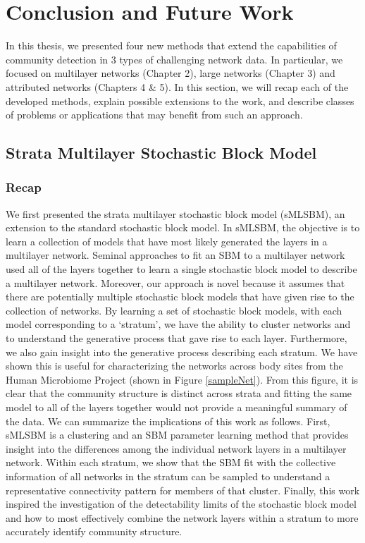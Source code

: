 \chapter{Conclusion and Future Work}
In this thesis, we presented four new methods that extend the capabilities of community detection in 3 types of challenging network data. In particular, we focused on multilayer networks (Chapter 2), large networks (Chapter 3) and attributed networks (Chapters 4 \& 5). In this section, we will recap each of the developed methods, explain possible extensions to the work, and describe classes of problems or applications that may benefit from such an approach.

\section{Strata Multilayer Stochastic Block Model}
\subsection{Recap}
We first presented the strata multilayer stochastic block model (sMLSBM), an extension to the standard stochastic block model. In sMLSBM, the objective is to learn a collection of models that have most likely generated the layers in a multilayer network. Seminal approaches to fit an SBM to a multilayer network used all of the layers together to learn a single stochastic block model to describe a multilayer network. Moreover, our approach is novel because it assumes that there are potentially multiple stochastic block models that have given rise to the collection of networks. By learning a set of stochastic block models, with each model corresponding to a `stratum', we have the ability to cluster networks and to understand the generative process that gave rise to each layer. Furthermore, we also gain insight into the generative process describing each stratum. We have shown this is useful for characterizing the networks across body sites from the Human Microbiome Project (shown in Figure \ref{sampleNet}). From this figure, it is clear that the community structure is distinct across strata and fitting the same model to all of the layers together would not provide a meaningful summary of the data. We can summarize the implications of this work as follows. First, sMLSBM is a clustering and an SBM parameter learning method that provides insight into the differences among the individual network layers in a multilayer network. Within each stratum, we show that the SBM fit with the collective information of all networks in the stratum can be sampled to understand a representative connectivity pattern for members of that cluster. Finally, this work inspired the investigation of the detectability limits of the stochastic block model and how to most effectively combine the network layers within a stratum to more accurately identify community structure.


